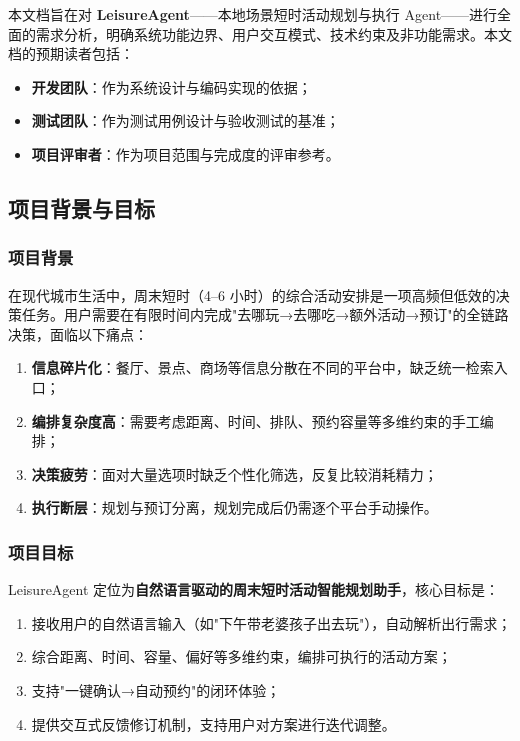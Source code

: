\documentclass[12pt,a4paper]{ctexart}
\begin{document}
本文档旨在对 \textbf{LeisureAgent}——本地场景短时活动规划与执行 Agent——进行全面的需求分析，明确系统功能边界、用户交互模式、技术约束及非功能需求。本文档的预期读者包括：

\begin{itemize}
  \item \textbf{开发团队}：作为系统设计与编码实现的依据；
  \item \textbf{测试团队}：作为测试用例设计与验收测试的基准；
  \item \textbf{项目评审者}：作为项目范围与完成度的评审参考。
\end{itemize}

\subsection{项目背景与目标}

\subsubsection{项目背景}

在现代城市生活中，周末短时（4--6 小时）的综合活动安排是一项高频但低效的决策任务。用户需要在有限时间内完成"去哪玩→去哪吃→额外活动→预订"的全链路决策，面临以下痛点：

\begin{enumerate}[label=(\arabic*)]
  \item \textbf{信息碎片化}：餐厅、景点、商场等信息分散在不同的平台中，缺乏统一检索入口；
  \item \textbf{编排复杂度高}：需要考虑距离、时间、排队、预约容量等多维约束的手工编排；
  \item \textbf{决策疲劳}：面对大量选项时缺乏个性化筛选，反复比较消耗精力；
  \item \textbf{执行断层}：规划与预订分离，规划完成后仍需逐个平台手动操作。
\end{enumerate}

\subsubsection{项目目标}

LeisureAgent 定位为\textbf{自然语言驱动的周末短时活动智能规划助手}，核心目标是：

\begin{enumerate}[label=(\arabic*)]
  \item 接收用户的自然语言输入（如"下午带老婆孩子出去玩"），自动解析出行需求；
  \item 综合距离、时间、容量、偏好等多维约束，编排可执行的活动方案；
  \item 支持"一键确认→自动预约"的闭环体验；
  \item 提供交互式反馈修订机制，支持用户对方案进行迭代调整。
\end{enumerate}
\end{document}
